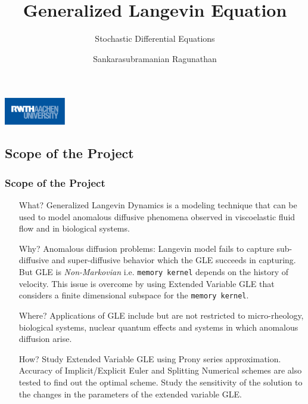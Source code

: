 \documentclass[a4paper,10pt]{beamer}
\title{Generalized Langevin Equation}
\subtitle{Stochastic Differential Equations}
\author{Sankarasubramanian Ragunathan \newline \newline 389851}
\institute{\textbf{RWTH Aachen}}
\date{}
\begin{document}
	\begin{frame}
		\titlepage
		\centering
		\includegraphics[width=0.2\textwidth]{RWTH_Aachen_University_Logo.eps}
	\end{frame}

	\begin{frame}
		\tableofcontents
	\end{frame}

	\begin{frame}
		\small
		\section{Scope of the Project}
		\frametitle{Scope of the Project}
		
		\begin{itemize}
			\item[What?]{Generalized Langevin Dynamics is a modeling technique that can be used to model anomalous diffusive phenomena observed in viscoelastic fluid flow and in biological systems.}
			
			\item[Why?]{Anomalous diffusion problems: Langevin model fails to capture sub-diffusive and super-diffusive behavior which the GLE succeeds in capturing. But GLE is \textit{Non-Markovian} i.e. \texttt{memory kernel} depends on the history of velocity. This issue is overcome by using Extended Variable GLE that considers a finite dimensional subspace for the \texttt{memory kernel}.}
			
			\item[Where?]{Applications of GLE include but are not restricted to micro-rheology, biological systems, nuclear quantum effects and systems in which anomalous diffusion arise.}
			
			\item[How?]{Study Extended Variable GLE using Prony series approximation. Accuracy of Implicit/Explicit Euler and Splitting Numerical schemes are also tested to find out the optimal scheme. Study the sensitivity of the solution to the changes in the parameters of the extended variable GLE.}
			
		\end{itemize}
	\end{frame}

\end{document}
